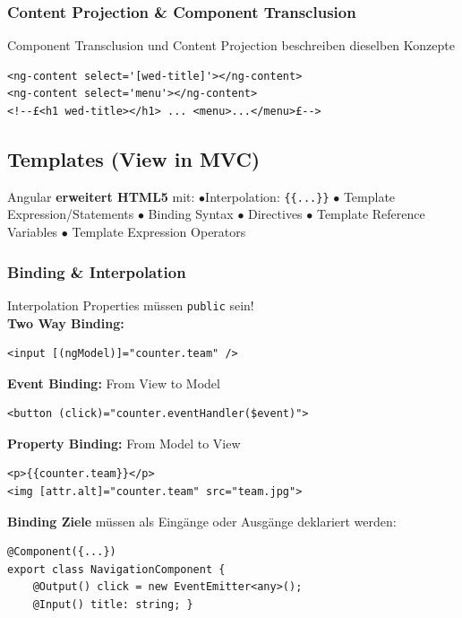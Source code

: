 \subsubsection{Content Projection \& Component Transclusion}
Component Transclusion und Content Projection beschreiben dieselben Konzepte
\begin{lstlisting}[style=HTML]
<ng-content select='[wed-title]'></ng-content>
<ng-content select='menu'></ng-content>
<!--£<h1 wed-title></h1> ... <menu>...</menu>£-->
\end{lstlisting}

\subsection{Templates (View in MVC)}
Angular \textbf{erweitert HTML5} mit:
$\bullet$Interpolation: \texttt{\tiny \{\{...\}\}}
$\bullet$ Template Expression/Statements
$\bullet$ Binding Syntax
$\bullet$ Directives
$\bullet$ Template Reference Variables
$\bullet$ Template Expression Operators

\subsubsection{Binding \& Interpolation}
Interpolation Properties müssen \texttt{\tiny public} sein!\\
\textbf{Two Way Binding:}
\begin{lstlisting}[style=HTML]
<input [(ngModel)]="counter.team" />
\end{lstlisting}
\textbf{Event Binding:} From View to Model
\begin{lstlisting}[style=HTML]
<button (click)="counter.eventHandler($event)">
\end{lstlisting}
\textbf{Property Binding:} From Model to View
\begin{lstlisting}[style=HTML]
<p>{{counter.team}}</p>
<img [attr.alt]="counter.team" src="team.jpg">
\end{lstlisting}
\textbf{Binding Ziele} müssen als Eingänge oder Ausgänge deklariert werden:
\begin{lstlisting}[style=JavaScript]
@Component({...})
export class NavigationComponent {
    @Output() click = new EventEmitter<any>();
    @Input() title: string; }
\end{lstlisting}


